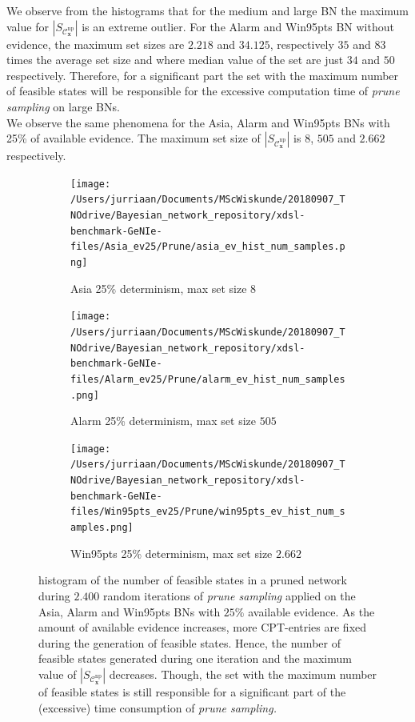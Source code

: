 \documentclass[a4paper, twoside, 11pt]{report}
\newcommand{\bfx}{{\mathbf{x}}}
\newcommand{\C}{{\mathcal C}}
\theoremstyle{plain}
\theoremstyle{definition}
\theoremstyle{remark}
\newcommand{\ps}{\textit{prune sampling }}
\newcommand{\psp}{\textit{prune sampling. }}
\begin{document}
We observe from the histograms that for the medium and large BN the maximum value for $|S_{\C_\bfx^{\text{np}}}|$ is an extreme outlier. For the Alarm and Win95pts BN without evidence, the maximum set sizes are $2.218$ and $34.125$, respectively $35$ and $83$ times the average set size and where median value of the set are just $34$ and $50$ respectively. Therefore, for a significant part the set with the maximum number of feasible states will be responsible for the excessive computation time of \ps on large BNs.\\

We observe the same phenomena for the Asia, Alarm and Win95pts BNs with 25\% of available evidence. The maximum set size of $|S_{\C_\bfx^{\text{np}}}|$ is $8$, $505$ and $2.662$ respectively. 
\begin{figure}[t!]
\centering
\captionsetup[subfigure]{justification=centering}

\begin{subfigure}{.3\linewidth}
\texttt{[image: /Users/jurriaan/Documents/MScWiskunde/20180907\_TNOdrive/Bayesian\_network\_repository/xdsl-benchmark-GeNIe-files/Asia\_ev25/Prune/asia\_ev\_hist\_num\_samples.png]}
\caption{Asia 25\% determinism, max set size $8$}%
\label{asia_ev}%
\end{subfigure}\hfill%
\begin{subfigure}{.3\linewidth}
\texttt{[image: /Users/jurriaan/Documents/MScWiskunde/20180907\_TNOdrive/Bayesian\_network\_repository/xdsl-benchmark-GeNIe-files/Alarm\_ev25/Prune/alarm\_ev\_hist\_num\_samples.png]}
\caption{Alarm 25\% determinism, max set size $505$}%
\label{alarm_ev}%
\end{subfigure}\hfill%
\begin{subfigure}{.3\linewidth}
\texttt{[image: /Users/jurriaan/Documents/MScWiskunde/20180907\_TNOdrive/Bayesian\_network\_repository/xdsl-benchmark-GeNIe-files/Win95pts\_ev25/Prune/win95pts\_ev\_hist\_num\_samples.png]}
\caption{Win95pts 25\% determinism, max set size $2.662$}%
\label{win95pts_ev}%
\end{subfigure}\hfill%

\vspace{0.75pc}
\caption{histogram of the number of feasible states in a pruned network during $2.400$ random iterations of \ps applied on the Asia, Alarm and Win95pts BNs with $25\%$ available evidence.  As the amount of available evidence increases, more CPT-entries are fixed during the generation of feasible states. Hence, the number of feasible states generated during one iteration and the maximum value of $|S_{\C_\bfx^{\text{np}}}|$ decreases. Though, the set with the maximum number of feasible states is still responsible for a significant part of the (excessive) time consumption of \psp }
\label{results5}
\end{figure}
\end{document}
